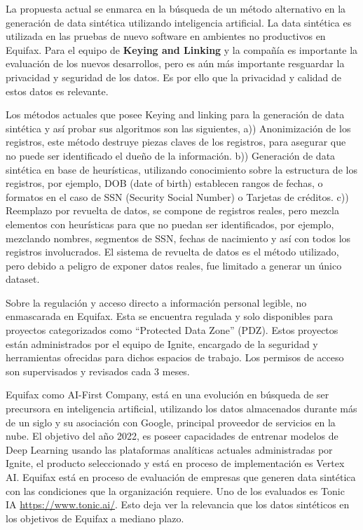 La propuesta actual se enmarca en la búsqueda de un método alternativo en la generación de data sintética utilizando inteligencia artificial. La data sintética es utilizada en las pruebas de nuevo software en ambientes no productivos en Equifax. Para el equipo de \textbf{Keying and Linking} y la compañía es importante la evaluación de los nuevos desarrollos, pero es aún más importante resguardar la privacidad y seguridad de los datos. Es por ello que la privacidad y calidad de estos datos es relevante.

Los métodos actuales que posee Keying and linking para la generación de data sintética y así probar sus algoritmos son las siguientes, a)) Anonimización de los registros, este método destruye piezas claves de los registros, para asegurar que no puede ser identificado el dueño de la información. b)) Generación de data sintética en base de heurísticas, utilizando conocimiento sobre la estructura de los registros, por ejemplo, DOB (date of birth) establecen rangos de fechas, o formatos en el caso de SSN (Security Social Number) o Tarjetas de créditos. c)) Reemplazo por revuelta de datos, se compone de registros reales, pero mezcla elementos con heurísticas para que no puedan ser identificados, por ejemplo, mezclando nombres, segmentos de SSN, fechas de nacimiento y así con todos los registros involucrados. El sistema de revuelta de datos es el método utilizado, pero debido a peligro de exponer datos reales, fue limitado a generar un único dataset. 

Sobre la regulación y acceso directo a información personal legible, no enmascarada en Equifax. Esta se encuentra regulada y solo disponibles para proyectos categorizados como “Protected Data Zone” (PDZ). Estos proyectos están administrados por el equipo de Ignite, encargado de la seguridad y herramientas ofrecidas para dichos espacios de trabajo. Los permisos de acceso son supervisados y revisados cada 3 meses.

Equifax como AI-First Company, está en una evolución en búsqueda de ser precursora en inteligencia artificial, utilizando los datos almacenados durante más de un siglo y su asociación con Google, principal proveedor de servicios en la nube. El objetivo del año 2022, es poseer capacidades de entrenar modelos de Deep Learning usando las plataformas analíticas actuales administradas por Ignite, el producto seleccionado y está en proceso de implementación es Vertex AI. Equifax está en proceso de evaluación de empresas que generen data sintética con las condiciones que la organización requiere. Uno de los evaluados es Tonic IA \url{https://www.tonic.ai/}. Esto deja ver la relevancia que los datos sintéticos en los objetivos de Equifax a mediano plazo.

